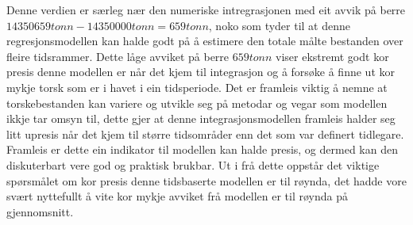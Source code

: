 \documentclass{report}
\begin{document}
Denne verdien er særleg nær den numeriske intregrasjonen med eit avvik på berre $14350659tonn-14350000tonn=659tonn$, noko som tyder til at denne regresjonsmodellen kan halde godt på å estimere den totale målte bestanden over fleire tidsrammer.
Dette låge avviket på berre $659tonn$ viser ekstremt godt kor presis denne modellen er når det kjem til integrasjon og å forsøke å finne ut kor mykje torsk som er i havet i ein tidsperiode.
Det er framleis viktig å nemne at torskebestanden kan variere og utvikle seg på metodar og vegar som modellen ikkje tar omsyn til, dette gjer at denne integrasjonsmodellen framleis halder seg litt upresis når det kjem til større tidsområder enn det som var definert tidlegare.
Framleis er dette ein indikator til modellen kan halde presis, og dermed kan den diskuterbart vere god og praktisk brukbar.
Ut i frå dette oppstår det viktige spørsmålet om kor presis denne tidsbaserte modellen er til røynda, det hadde vore svært nyttefullt å vite kor mykje avviket frå modellen er til røynda på gjennomsnitt.
\end{document}
